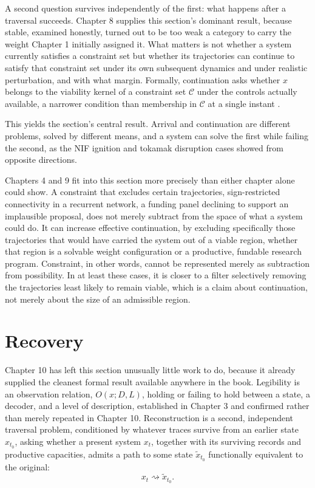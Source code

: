 \documentclass[11pt]{book}
\begin{document}
A second question survives independently of the first: what happens after a traversal succeeds. Chapter 8 supplies this section's dominant result, because stable, examined honestly, turned out to be too weak a category to carry the weight Chapter 1 initially assigned it. What matters is not whether a system currently satisfies a constraint set but whether its trajectories can continue to satisfy that constraint set under its own subsequent dynamics and under realistic perturbation, and with what margin. Formally, continuation asks whether \(x\) belongs to the viability kernel of a constraint set \(\mathcal{C}\) under the controls actually available, a narrower condition than membership in \(\mathcal{C}\) at a single instant \cite{aubin1991}.

This yields the section's central result. Arrival and continuation are different problems, solved by different means, and a system can solve the first while failing the second, as the NIF ignition and tokamak disruption cases showed from opposite directions.

Chapters 4 and 9 fit into this section more precisely than either chapter alone could show. A constraint that excludes certain trajectories, sign-restricted connectivity in a recurrent network, a funding panel declining to support an implausible proposal, does not merely subtract from the space of what a system could do. It can increase effective continuation, by excluding specifically those trajectories that would have carried the system out of a viable region, whether that region is a solvable weight configuration or a productive, fundable research program. Constraint, in other words, cannot be represented merely as subtraction from possibility. In at least these cases, it is closer to a filter selectively removing the trajectories least likely to remain viable, which is a claim about continuation, not merely about the size of an admissible region.

\section{Recovery}

Chapter 10 has left this section unusually little work to do, because it already supplied the cleanest formal result available anywhere in the book. Legibility is an observation relation, \(O(x; D, L)\), holding or failing to hold between a state, a decoder, and a level of description, established in Chapter 3 and confirmed rather than merely repeated in Chapter 10. Reconstruction is a second, independent traversal problem, conditioned by whatever traces survive from an earlier state \(x_{t_0}\), asking whether a present system \(x_t\), together with its surviving records and productive capacities, admits a path to some state \(\tilde{x}_{t_0}\) functionally equivalent to the original:
\[
x_t \rightsquigarrow \tilde{x}_{t_0}.
\]
\end{document}
